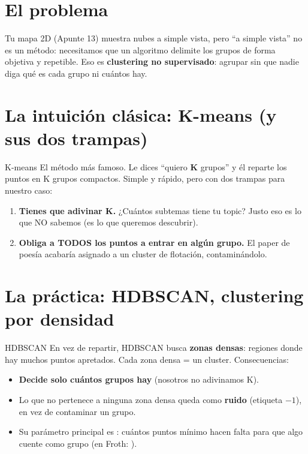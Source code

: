 \documentclass[11pt,a4paper]{article}
\begin{document}
\section{El problema}

Tu mapa 2D (Apunte 13) muestra nubes a simple vista, pero ``a simple vista'' no es un método:
necesitamos que un algoritmo delimite los grupos de forma objetiva y repetible. Eso es
\textbf{clustering no supervisado}: agrupar sin que nadie diga qué es cada grupo ni cuántos hay.

\section{La intuición clásica: K-means (y sus dos trampas)}

\begin{concepto}{K-means}
El método más famoso. Le dices ``quiero \textbf{K} grupos'' y él reparte los puntos en K
grupos compactos. Simple y rápido, pero con dos trampas para nuestro caso:
\begin{enumerate}
  \item \textbf{Tienes que adivinar K.} ¿Cuántos subtemas tiene tu topic? Justo eso es lo que
        NO sabemos (es lo que queremos descubrir).
  \item \textbf{Obliga a TODOS los puntos a entrar en algún grupo.} El paper de poesía
        acabaría asignado a un cluster de flotación, contaminándolo.
\end{enumerate}
\end{concepto}

\section{La práctica: HDBSCAN, clustering por densidad}

\begin{concepto}{HDBSCAN}
En vez de repartir, HDBSCAN busca \textbf{zonas densas}: regiones donde hay muchos puntos
apretados. Cada zona densa = un cluster. Consecuencias:
\begin{itemize}
  \item \textbf{Decide solo cuántos grupos hay} (nosotros no adivinamos K).
  \item Lo que no pertenece a ninguna zona densa queda como \textbf{ruido} (etiqueta $-1$),
        en vez de contaminar un grupo.
  \item Su parámetro principal es : cuántos puntos mínimo hacen
        falta para que algo cuente como grupo (en Froth: ).
\end{itemize}
\end{concepto}
\end{document}
